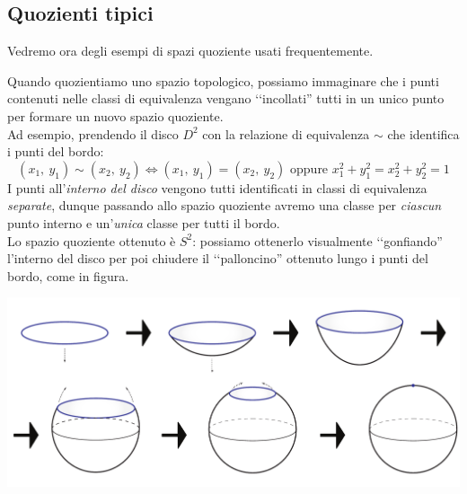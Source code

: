 	\subsection{Quozienti tipici}
Vedremo ora degli esempi di spazi quoziente usati frequentemente.
\begin{intuit}
	Quando quozientiamo uno spazio topologico, possiamo immaginare che i punti contenuti nelle classi di equivalenza vengano ‘‘incollati'' tutti in un unico punto per formare un nuovo spazio quoziente.\\
	Ad esempio, prendendo il disco $D^2$ con la relazione di equivalenza $\sim$ che identifica i punti del bordo:
	\begin{equation*}
		(x_1,\ y_1) \sim (x_2,\ y_2)\iff (x_1,\ y_1)=(x_2,\ y_2) \text{ oppure } x_1^2 +y_1^2= x_2^2 +y_2^2=1
	\end{equation*} 
	I punti all'\textit{interno del disco} vengono tutti identificati in classi di equivalenza \textit{separate}, dunque passando allo spazio quoziente avremo una classe per \textit{ciascun} punto interno e un'\textit{unica} classe per tutti il bordo.\\
	Lo spazio quoziente ottenuto è $S^2$: possiamo ottenerlo visualmente ‘‘gonfiando'' l'interno del disco per poi chiudere il ‘‘palloncino'' ottenuto lungo i punti del bordo, come in figura.
	\begin{center}
		\includegraphics[trim=0cm 0cm 0cm 0cm,clip,scale=0.4]{images/disctosphere.pdf}
	\end{center}
\end{intuit}
